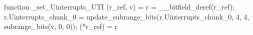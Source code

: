 function _set_Uinterrupts_UTI (r_ref, v) = {
    r = __bitfield_deref(r_ref);
    r.Uinterrupts_chunk_0 = update_subrange_bits(r.Uinterrupts_chunk_0, 4, 4, subrange_bits(v, 0, 0));
    (*r_ref) = r
}
